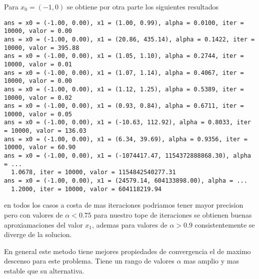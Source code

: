 \documentclass[letterpaper]{article}
\begin{document}
Para \(x_0 = (-1,0)\) se obtiene por otra parte los siguientes resultados
\begin{verbatim}
ans = x0 = (-1.00, 0.00), x1 = (1.00, 0.99), alpha = 0.0100, iter = 10000, valor = 0.00
ans = x0 = (-1.00, 0.00), x1 = (20.86, 435.14), alpha = 0.1422, iter = 10000, valor = 395.88
ans = x0 = (-1.00, 0.00), x1 = (1.05, 1.10), alpha = 0.2744, iter = 10000, valor = 0.01
ans = x0 = (-1.00, 0.00), x1 = (1.07, 1.14), alpha = 0.4067, iter = 10000, valor = 0.00
ans = x0 = (-1.00, 0.00), x1 = (1.12, 1.25), alpha = 0.5389, iter = 10000, valor = 0.02
ans = x0 = (-1.00, 0.00), x1 = (0.93, 0.84), alpha = 0.6711, iter = 10000, valor = 0.05
ans = x0 = (-1.00, 0.00), x1 = (-10.63, 112.92), alpha = 0.8033, iter = 10000, valor = 136.03
ans = x0 = (-1.00, 0.00), x1 = (6.34, 39.69), alpha = 0.9356, iter = 10000, valor = 60.90
ans = x0 = (-1.00, 0.00), x1 = (-1074417.47, 1154372888868.30), alpha = ...
  1.0678, iter = 10000, valor = 1154842540277.31
ans = x0 = (-1.00, 0.00), x1 = (24579.14, 604133898.00), alpha = ...
  1.2000, iter = 10000, valor = 604118219.94
\end{verbatim}
en todos los casos a costa de mas iteraciones podriamos tener mayor
precision pero con valores de \(\alpha < 0.75\) para nuestro tope de
iteraciones se obtienen buenas aproxiamaciones del valor \(x_1\), ademas
para valores de \(\alpha > 0.9\) consistentemente se diverge de la solucion.

En general este metodo tiene mejores propiedades de convergencia el de
maximo descenso para este problema. Tiene un rango de valores \(\alpha\)
mas amplio y mas estable que su alternativa.
\end{document}
